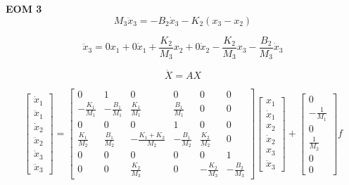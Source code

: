 \documentclass[letterpaper,11pt]{article}
\begin{document}
\noindent \textbf{EOM 3}
\[
M_3 \ddot{x}_3 = -B_2 \dot{x}_3 - K_2(x_3 - x_2)
\]

\[
\ddot{x}_3 = 0   x_1 + 0   \dot{x}_1 + \frac{K_2}{M_3} x_2 + 0   \dot{x}_2 - \frac{K_2}{M_3} x_3 - \frac{B_2}{M_3} \dot{x}_3
\]

\[
\dot{X} = A X
\]

\[
\begin{bmatrix}
\dot{x}_1 \\
\ddot{x}_1 \\
\dot{x}_2 \\
\ddot{x}_2 \\
\dot{x}_3 \\
\ddot{x}_3
\end{bmatrix}
=
\begin{bmatrix}
0 & 1 & 0 & 0 & 0 & 0 \\
-\frac{K_1}{M_1} & -\frac{B_1}{M_1} & \frac{K_1}{M_1} & \frac{B_1}{M_1} & 0 & 0 \\
0 & 0 & 0 & 1 & 0 & 0 \\
\frac{K_1}{M_2} & \frac{B_1}{M_2} & -\frac{K_1+K_2}{M_2} & -\frac{B_1}{M_2} & \frac{K_2}{M_2} & 0 \\
0 & 0 & 0 & 0 & 0 & 1 \\
0 & 0 & \frac{K_2}{M_3} & 0 & -\frac{K_2}{M_3} & -\frac{B_2}{M_3}
\end{bmatrix}
\begin{bmatrix}
x_1 \\
\dot{x}_1 \\
x_2 \\
\dot{x}_2 \\
x_3 \\
\dot{x}_3
\end{bmatrix}
+
\begin{bmatrix}
0 \\
-\frac{1}{M_1} \\
0 \\
\frac{1}{M_2} \\
0 \\
0
\end{bmatrix}
f
\]

%

\end{document}
